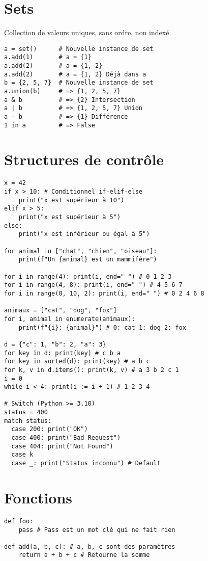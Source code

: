 \documentclass{article}
\begin{document}
\begin{multicols*}{4}
\section*{Sets}
Collection de valeurs uniques, sans ordre, non indexé.
\begin{lstlisting}
a = set()      # Nouvelle instance de set
a.add(1)       # a = {1}
a.add(2)       # a = {1, 2}
a.add(2)       # a = {1, 2} Déjà dans a
b = {2, 5, 7}  # Nouvelle instance de set
a.union(b)     # => {1, 2, 5, 7}
a & b          # => {2} Intersection
a | b          # => {1, 2, 5, 7} Union
a - b          # => {1} Différence
1 in a         # => False
\end{lstlisting}

\section*{Structures de contrôle}
\begin{lstlisting}
x = 42
if x > 10: # Conditionnel if-elif-else
    print("x est supérieur à 10")
elif x > 5:
    print("x est supérieur à 5")
else:
    print("x est inférieur ou égal à 5")

for animal in ["chat", "chien", "oiseau"]:
    print(f"Un {animal} est un mammifère")

for i in range(4): print(i, end=" ") # 0 1 2 3
for i in range(4, 8): print(i, end=" ") # 4 5 6 7
for i in range(0, 10, 2): print(i, end=" ") # 0 2 4 6 8

animaux = ["cat", "dog", "fox"]
for i, animal in enumerate(animaux):
    print(f"{i}: {animal}") # 0: cat 1: dog 2: fox

d = {"c": 1, "b": 2, "a": 3}
for key in d: print(key) # c b a
for key in sorted(d): print(key) # a b c
for k, v in d.items(): print(k, v) # a 3 b 2 c 1
i = 0
while i < 4: print(i := i + 1) # 1 2 3 4

# Switch (Python >= 3.10)
status = 400
match status:
  case 200: print("OK")
  case 400: print("Bad Request")
  case 404: print("Not Found")
  case k
  case _: print("Status inconnu") # Default
\end{lstlisting}

\section*{Fonctions}
\begin{lstlisting}
def foo:
    pass # Pass est un mot clé qui ne fait rien

def add(a, b, c): # a, b, c sont des paramètres
    return a + b + c # Retourne la somme


\end{lstlisting}
\end{multicols*}
\end{document}
